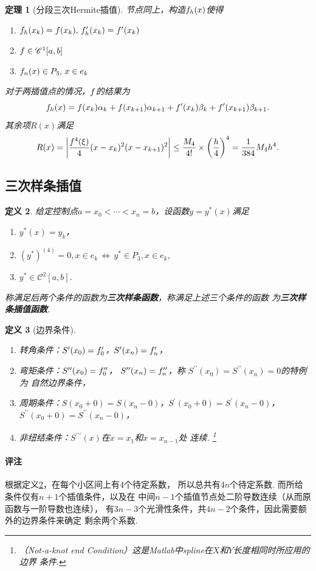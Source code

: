 \documentclass[12pt, a4paper]{article}
\theoremstyle{margin}
\newtheorem{thm}{定理}
\newtheorem{defi}[thm]{定义}
\newcommand{\pr}{\prime}
\newcommand{\hp}{^\prime}
\newcommand{\ms}{\mathscr}
\newcommand{\tbf}{\textbf}
\newcommand{\f}{\mathnormal{f}}
\newcommand\defref[1]{定义\ref{#1}}
\newcommand{\remark}{\paragraph{评注}}
\begin{document}
  \begin{thm}[分段三次Hermite插值]
    节点同上，构造$\f_h(x)$使得
    \begin{enumerate}
      \item $\f_h(x_k) = \f(x_k),\,\f_h\hp(x_k) = \f\hp(x_k)$
      \item $\f\in \ms{C}^1[a, b]$
      \item $\f_n(x) \in P_3,\,x\in e_k$
    \end{enumerate}
    对于两插值点的情况，$\f$的结果为
    \[
      \f_h(x) = \f(x_k)\alpha_k + \f(x_{k+1})\alpha_{k+1}
       + \f\hp(x_k)\beta_k + \f\hp(x_{k+1})\beta_{k+1}.
    \]
    其余项$R(x)$满足
    \[
      R(x) = \left|\frac{\f^{4}(\xi)}{4}(x-x_{k})^2(x-x_{k+1})^2\right|
      \le \frac{M_4}{4!}\times\left(\frac{h}{4}\right)^4
      =\frac{1}{384}M_4h^4.
    \]
  \end{thm}

\subsection{三次样条插值}
  \begin{defi}
    \label{defi: 三次样条插值}
    给定控制点$a = x_0 < \cdots < x_n = b$，设函数$y=y^*(x)$满足
    \begin{enumerate}
      \item $y^*(x) = y_k$，
      \item $(y^*)^{(4)} = 0,x\in e_k\,\Leftrightarrow
      \,y^* \in P_3,x\in e_k$,
      \item $y^*\in\ms{C}^2[a, b]$.
    \end{enumerate}
    称满足后两个条件的函数为\tbf{三次样条函数}，称满足上述三个条件的函数
    为\tbf{三次样条插值函数}.
  \end{defi}

  \begin{defi}[边界条件]
    $\,$
    \begin{enumerate}
      \item 转角条件：$S\hp(x_0) = \f_0\hp$，$S\hp(x_n) = \f_n\hp$，
      \item 弯矩条件：$S^{\prime\prime}(x_0) = \f_0^{\prime\prime}$，
      $S^{\prime\prime}(x_n) = \f_n^{\prime\prime}$，称
      $S^{\prime\prime}(x_0) = S^{\prime\prime}(x_n) = 0$的特例为
      自然边界条件，
      \item 周期条件：$S(x_0+0)=S(x_n-0)$，$S\hp(x_0+0)=S\hp(x_n-0)$，
      $S^{\prime\prime}(x_0+0)=S^{\prime\prime}(x_n-0)$，
      \item 非纽结条件：$S^{\pr\pr\pr}(x)$在$x=x_1$和$x=x_{n-1}$处
      连续. \footnote{（Not-a-knot end Condition）这是Matlab中spline在$X$和$Y$长度相同时所应用的边界
      条件. }
    \end{enumerate}
  \end{defi}
  \remark
    根据\defref{defi: 三次样条插值}，在每个小区间上有$4$个待定系数，
    所以总共有$4n$个待定系数. 而所给条件仅有$n+1$个插值条件，以及在
    中间$n-1$个插值节点处二阶导数连续（从而原函数与一阶导数也连续），
    有$3n-3$个光滑性条件，共$4n-2$个条件，因此需要额外的边界条件来确定
    剩余两个系数.
\end{document}
